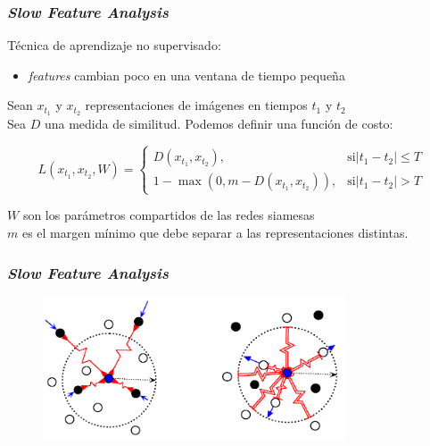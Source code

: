 \documentclass{beamer}
\begin{document}
\begin{frame}
\frametitle{\textit{Slow Feature Analysis}}

Técnica de aprendizaje no supervisado:
\begin{itemize}
    \item \textit{features} cambian poco en una ventana de tiempo pequeña \pause
	\end{itemize}

	Sean \(x_{t_1}\) y \(x_{t_2}\) representaciones de imágenes en tiempos \(t_1\) y \(t_2\)\\
Sea \(D\) una medida de similitud. Podemos definir una función de costo:

\begin{equation}
L(x_{t_1}, x_{t_2}, W) = \begin{cases}
                           D(x_{t_1}, x_{t_2}),& \text{si} |t_1 - t_2| \leq T \\ 
                           1 - \max{(0, m - D(x_{t_1}, x_{t_2}))},& \text{si} |t_1 - t_2| > T
                         \end{cases}
\end{equation}

\(W\) son los parámetros compartidos de las redes siamesas\\
\(m\) es el margen mínimo que debe separar a las representaciones distintas.
\end{frame}


\begin{frame}
\frametitle{\textit{Slow Feature Analysis}}
\begin{figure}
    \centering
    \includegraphics[width=0.8\textwidth]{images/example_contrastiveloss.png}
\end{figure}
\end{frame}
\end{document}
